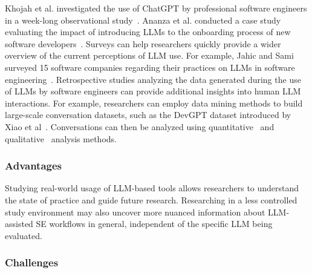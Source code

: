 Khojah et al. investigated the use of ChatGPT by professional software engineers in a week-long observational study~\cite{DBLP:journals/pacmse/KhojahM0N24}.
Ananza et al. conducted a case study evaluating the impact of introducing LLMs to the onboarding process of new software developers~\cite{DBLP:conf/csee/AzanzaPIG24}.
Surveys can help researchers quickly provide a wider overview of the current perceptions of LLM use.
For example, Jahic and Sami surveyed 15 software companies regarding their practices on LLMs in software engineering~\cite{DBLP:conf/icsa/JahicS24}.
Retrospective studies analyzing the data generated during the use of LLMs by software engineers can provide additional insights into human LLM interactions.
For example, researchers can employ data mining methods to build large-scale conversation datasets, such as the DevGPT dataset introduced by Xiao et al~\cite{DBLP:conf/msr/XiaoTHM24}.
Conversations can then be analyzed using quantitative~\cite{DBLP:conf/msr/RabbiCZI24} and qualitative~\cite{DBLP:conf/msr/MohamedPP24} analysis methods.

\subsubsection{Advantages}

Studying real-world usage of LLM-based tools allows researchers to understand the state of practice and guide future research.
Researching in a less controlled study environment may also uncover more nuanced information about LLM-assisted SE workflows in general, independent of the specific LLM being evaluated.

\subsubsection{Challenges}

